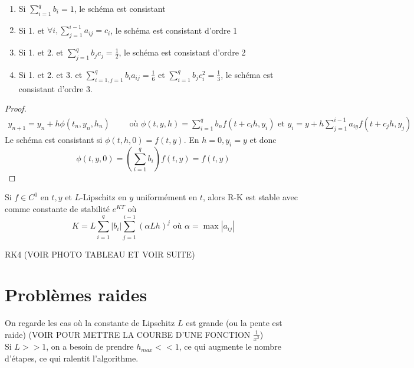 \documentclass[]{report}
\begin{document}
    \begin{tm}{}{}
        \begin{enumerate}
            \item Si $\sum_{i=1}^{q}b_i=1$, le schéma est consistant
            \item Si 1. et $\forall i, \sum_{j=1}^{i-1}a_{ij}=c_i$, le schéma est consistant d'ordre 1
            \item Si 1. et 2. et $\sum_{j=1}^{q}b_j c_j=\frac{1}{2}$, le schéma est consistant d'ordre 2
            \item Si 1. et 2. et 3. et $\sum_{i=1,j=1}^{q}b_i a_{ij}=\frac{1}{6}$ et $\sum_{i=1}^{q}b_j c_i^2=\frac{1}{3}$, le schéma est consistant d'ordre 3.
        \end{enumerate}
    \end{tm}

    \begin{proof}
        \begin{align*}
            y_{n+1}=y_n+h\phi(t_n,y_n,h_n) \qquad \text{ où $\phi(t,y,h)=\sum_{i=1}^{q}b_n f(t+ c_i h,y_i)$ et $y_i=y+h\sum_{j=1}^{i-1}a_{iy}f(t+c_j h,y_j)$}
        \end{align*}
        Le schéma est consistant si $\phi(t,h,0)=f(t,y)$. En $h=0,y_i=y$ et donc
        \[ \phi(t,y,0)=\left(\sum_{i=1}^{q}b_i \right) f(t,y)=f(t,y)\]
    \end{proof}

    \begin{tm}{}{}
        Si $f\in C^0$ en $t,y$ et $L$-Lipschitz en $y$ uniformément en $t$, alors R-K est stable avec comme constante de stabilité $e^{KT}$ où
        \[K=L\sum_{i=1}^{q} \left| b_i\right|\sum_{j=1}^{i-1}(\alpha L h)^j\text{ où $\alpha = \max |a_{ij}|$}\]
    \end{tm}

    \begin{ex}{RK4}{}
        (VOIR PHOTO TABLEAU ET VOIR SUITE)
    \end{ex}

    \section{Problèmes raides}

    On regarde les cas où la constante de Lipschitz $L$ est grande (ou la pente est raide) (VOIR POUR METTRE LA COURBE D'UNE FONCTION $\frac{1}{x^2}$)\\
    Si $L>>1$, on a besoin de prendre $h_{max}<<1$, ce qui augmente le nombre d'étapes, ce qui ralentit l'algorithme.
\end{document}
